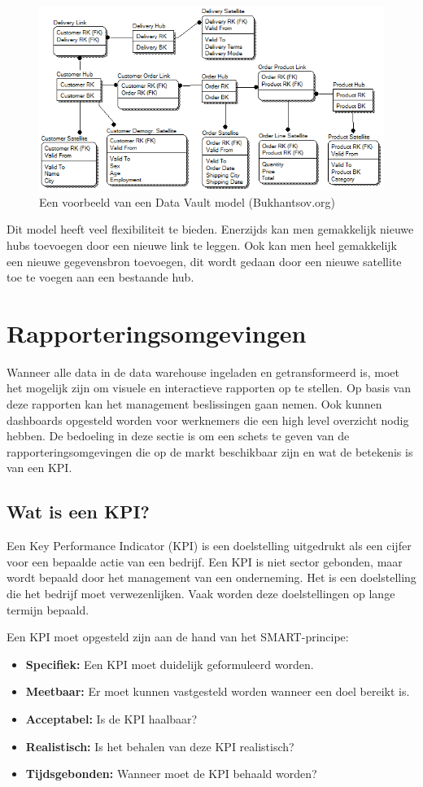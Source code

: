 \begin{figure}[h]
	\centering
	\includegraphics[scale=0.7]{../images/dvmodel.png}
	\caption{Een voorbeeld van een Data Vault model (Bukhantsov.org)}
	\label{fig:dvmod}
\end{figure}

Dit model heeft veel flexibiliteit te bieden. Enerzijds kan men gemakkelijk nieuwe hubs toevoegen door een nieuwe link te leggen. Ook kan men heel gemakkelijk een nieuwe gegevensbron toevoegen, dit wordt gedaan door een nieuwe satellite toe te voegen aan een bestaande hub. 

\section{Rapporteringsomgevingen}
\label{sec:omgeving}
Wanneer alle data in de data warehouse ingeladen en getransformeerd is, moet het mogelijk zijn om visuele en interactieve rapporten op te stellen. Op basis van deze rapporten kan het management beslissingen gaan nemen. Ook kunnen dashboards opgesteld worden voor werknemers die een high level overzicht nodig hebben. De bedoeling in deze sectie is om een schets te geven van de rapporteringsomgevingen die op de markt beschikbaar zijn en wat de betekenis is van een KPI. 

\subsection{Wat is een KPI?}
Een Key Performance Indicator (KPI) is een doelstelling uitgedrukt als een cijfer voor een bepaalde actie van een bedrijf. Een KPI is niet sector gebonden, maar wordt bepaald door het management van een onderneming. Het is een doelstelling die het bedrijf moet verwezenlijken. Vaak worden deze doelstellingen op lange termijn bepaald. 

Een KPI moet opgesteld zijn aan de hand van het SMART-principe:
\begin{itemize}
	\item \textbf{Specifiek: } Een KPI moet duidelijk geformuleerd worden.
	\item \textbf{Meetbaar: } Er moet kunnen vastgesteld worden wanneer een doel bereikt is.
	\item \textbf{Acceptabel:} Is de KPI haalbaar? 
	\item \textbf{Realistisch: } Is het behalen van deze KPI realistisch?
	\item \textbf{Tijdsgebonden: } Wanneer moet de KPI behaald worden?
\end{itemize} 

